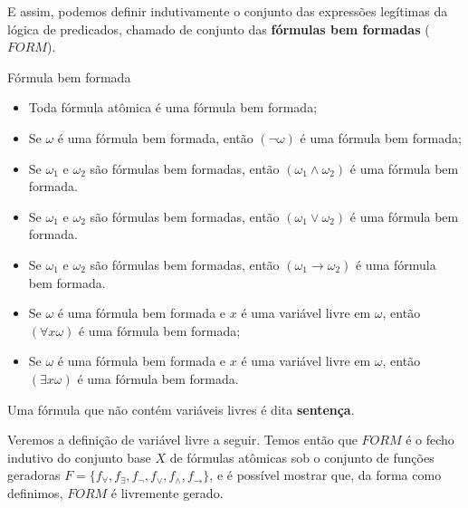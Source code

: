 E assim, podemos definir indutivamente o conjunto das expressões legítimas da lógica de predicados, chamado de conjunto das \textbf{fórmulas bem formadas} ($FORM$).
\begin{definition}{Fórmula bem formada}
    \begin{itemize}
        \item Toda fórmula atômica é uma fórmula bem formada;
        \item Se $\omega$ é uma fórmula bem formada, então $(\neg \omega)$ é uma fórmula bem formada;
        \item Se $\omega_1$ e $\omega_2$ são fórmulas bem formadas, então $(\omega_1 \land \omega_2)$ é uma fórmula bem formada.
        \item Se $\omega_1$ e $\omega_2$ são fórmulas bem formadas, então $(\omega_1 \lor \omega_2)$ é uma fórmula bem formada.
        \item Se $\omega_1$ e $\omega_2$ são fórmulas bem formadas, então $(\omega_1 \rightarrow \omega_2)$ é uma fórmula bem formada.
        \item Se $\omega$ é uma fórmula bem formada e $x$ é uma variável livre em $\omega$, então $(\forall x\omega)$ é uma fórmula bem formada;
        \item Se $\omega$ é uma fórmula bem formada e $x$ é uma variável livre em $\omega$, então $(\exists x\omega)$ é uma fórmula bem formada.
    \end{itemize}

    Uma fórmula que não contém variáveis livres é dita \textbf{sentença}.
\end{definition}

Veremos a definição de variável livre a seguir. Temos então que $FORM$ é o fecho indutivo do conjunto base $X$ de fórmulas atômicas sob o conjunto de funções geradoras $F = \{f_\forall, f_\exists, f_\neg, f_\lor, f_\land, f_\rightarrow\}$, e é possível mostrar que, da forma como definimos, $FORM$ é livremente gerado.